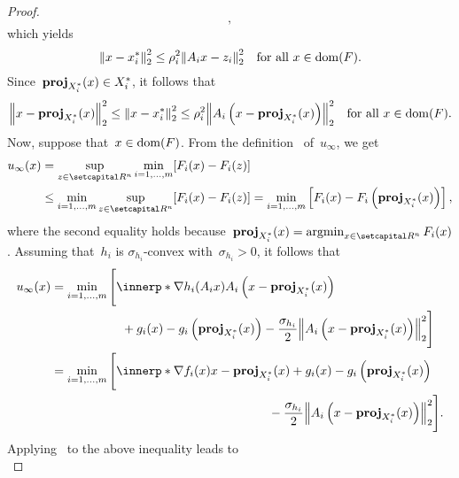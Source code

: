 \documentclass[../main]{subfiles}
\begin{document}
\begin{proof}
\begin{equation}
    ,\end{equation}
    which yields
    \begin{equation}
        \norm*{x - x_i^*}_2^2 \le \rho_i^2 \norm*{A_i x - z_i}_2^2 \forallcondition{x \in \dom(F)}
    .\end{equation}
    Since~$\operatorname{\mathbf{proj}}_{X_i^*}(x) \in X_i^*$, it follows that
    \begin{equation} \label{eq:proximal_PL_MO_sufficient:sc_linear:linear_trans_ineq}
        \norm*{x - \proj_{X_i^*}(x)}_2^2 \le \norm*{x - x_i^*}_2^2 \le \rho_i^2 \norm*{A_i \left(x - \proj_{X_i^*}(x)\right)}_2^2 \forallcondition{x \in \dom(F)}
    .\end{equation}
    Now, suppose that~$x \in \operatorname{dom}(F)$.
    From the definition~ of~$u_\infty$, we get
    \begin{align}
        u_\infty(x) &= \sup_{z \in \setR^n} \min_{i = 1, \dots, m} [F_i(x) - F_i(z)] \\
               &\le \min_{i = 1, \dots, m} \sup_{z \in \setR^n} [F_i(x) - F_i(z)] = \min_{i = 1, \dots, m} \left[ F_i(x) - F_i\left( \proj_{X_i^*}(x) \right) \right] 
    ,\end{align}
    where the second equality holds because~$\proj_{X_i^*}(x) = \argmin_{x \in \setR^n} F_i(x)$.
    Assuming that~$h_i$ is $\sigma_{h_i}$-convex with~$\sigma_{h_i} > 0$, it follows that
    \begin{align}
        u_\infty(x) &= \min_{i = 1, \dots, m}
        \begin{multlined}[t] \Biggl[ 
                \innerp*{\nabla h_i(A_i x)}{A_i \left(x - \proj_{X_i^*}(x)\right)} \\
                + g_i(x) - g_i\left( \proj_{X_i^*}(x) \right) - \frac{\sigma_{h_i}}{2} \norm*{A_i\left( x - \proj_{X_i^*}(x) \right) }_2^2 \Biggr] 
            \end{multlined} \\
               &= \min_{i = 1, \dots, m} 
               \begin{multlined}[t]
               \Biggl[ \innerp*{\nabla f_i(x)}{x - \proj_{X_i^*}(x)} + g_i(x) - g_i\left( \proj_{X_i^*}(x) \right) \\
               - \frac{\sigma_{h_i}}{2} \norm*{A_i \left( x - \proj_{X_i^*}(x) \right) }_2^2 \Biggr] 
               .\end{multlined}
    \end{align}
    Applying~ to the above inequality leads to
    \begin{equation}

\end{equation}
\end{proof}
\end{document}
